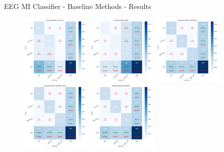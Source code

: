 \begin{frame}{EEG MI Classifier - Baseline Methods - Results}
    \begin{figure}[htpb!]
        \centering
        \includegraphics[width=0.30\textwidth]{figures/classification/confusion_matrix_csp_lda}
        \includegraphics[width=0.30\textwidth]{figures/classification/confusion_matrix_mdm}
        \includegraphics[width=0.30\textwidth]{figures/classification/confusion_matrix_tgsp_svm}
        \includegraphics[width=0.30\textwidth]{figures/classification/confusion_matrix_eegnetv4_pipe}
        \includegraphics[width=0.30\textwidth]{figures/classification/confusion_matrix_eegnetv4}
    \end{figure}
\end{frame}

